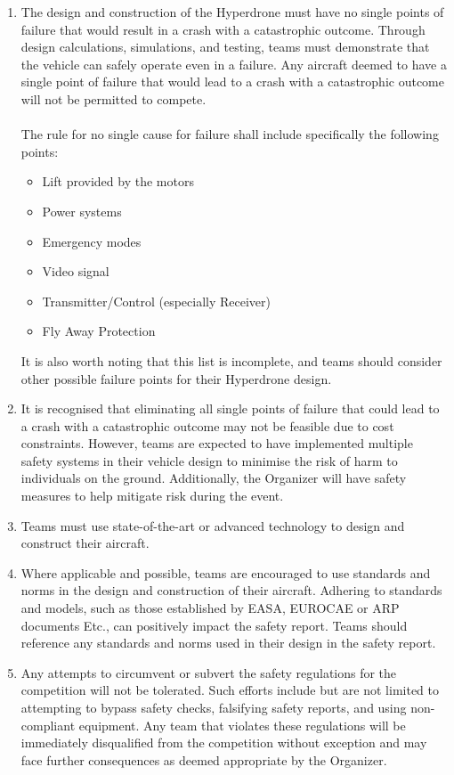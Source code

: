 \documentclass{article}
\begin{document}
\begin{enumerate}
  \item The design and construction of the Hyperdrone must have no single points of failure that would result in a crash with a catastrophic outcome. Through design calculations, simulations, and testing, teams must demonstrate that the vehicle can safely operate even in a failure. Any aircraft deemed to have a single point of failure that would lead to a crash with a catastrophic outcome will not be permitted to compete. \\ \\
  The rule for no single cause for failure shall include specifically the following points:
    \begin{itemize}
      \item Lift provided by the motors
      \item Power systems
      \item Emergency modes
      \item Video signal
      \item Transmitter/Control  (especially Receiver)
      \item Fly Away Protection 
    \end{itemize}
  It is also worth noting that this list is incomplete, and teams should consider other possible failure points for their Hyperdrone design.
  \item It is recognised that eliminating all single points of failure that could lead to a crash with a catastrophic outcome may not be feasible due to cost constraints. However, teams are expected to have implemented multiple safety systems in their vehicle design to minimise the risk of harm to individuals on the ground. Additionally, the Organizer will have safety measures to help mitigate risk during the event.
  \item Teams must use state-of-the-art or advanced technology to design and construct their aircraft.
  \item Where applicable and possible, teams are encouraged to use standards and norms in the design and construction of their aircraft. Adhering to standards and models, such as those established by EASA, EUROCAE or ARP documents Etc., can positively impact the safety report. Teams should reference any standards and norms used in their design in the safety report.
  \item Any attempts to circumvent or subvert the safety regulations for the competition will not be tolerated. Such efforts include but are not limited to attempting to bypass safety checks, falsifying safety reports, and using non-compliant equipment. Any team that violates these regulations will be immediately disqualified from the competition without exception and may face further consequences as deemed appropriate by the Organizer.

\end{enumerate}
\end{document}
